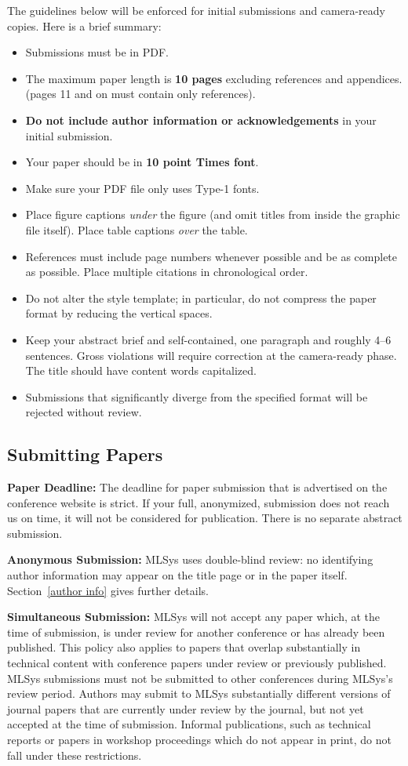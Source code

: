 \documentclass{article}
\begin{document}
The guidelines below will be enforced for initial submissions and
camera-ready copies. Here is a brief summary:
\begin{itemize}
\item Submissions must be in PDF\@.
\item The maximum paper length is \textbf{10 pages} excluding references and appendices.
    (pages 11 and on must contain only references).
\item \textbf{Do not include author information or acknowledgements} in your
    initial submission.
\item Your paper should be in \textbf{10 point Times font}.
\item Make sure your PDF file only uses Type-1 fonts.
\item Place figure captions \emph{under} the figure (and omit titles from inside
    the graphic file itself). Place table captions \emph{over} the table.
\item References must include page numbers whenever possible and be as complete
    as possible. Place multiple citations in chronological order.
\item Do not alter the style template; in particular, do not compress the paper
    format by reducing the vertical spaces.
\item Keep your abstract brief and self-contained, one paragraph and roughly
    4--6 sentences. Gross violations will require correction at the
    camera-ready phase. The title should have content words capitalized.
\item Submissions that significantly diverge from the specified format
    will be rejected without review.
\end{itemize}

\subsection{Submitting Papers}

\textbf{Paper Deadline:} The deadline for paper submission that is
advertised on the conference website is strict. If your full,
anonymized, submission does not reach us on time, it will not be
considered for publication. There is no separate abstract submission.

\textbf{Anonymous Submission:} MLSys uses double-blind review: no identifying
author information may appear on the title page or in the paper
itself. Section~\ref{author info} gives further details.

\textbf{Simultaneous Submission:} MLSys will not accept any paper which,
at the time of submission, is under review for another conference or
has already been published. This policy also applies to papers that
overlap substantially in technical content with conference papers
under review or previously published. MLSys submissions must not be
submitted to other conferences during MLSys's review period. Authors
may submit to MLSys substantially different versions of journal papers
that are currently under review by the journal, but not yet accepted
at the time of submission. Informal publications, such as technical
reports or papers in workshop proceedings which do not appear in
print, do not fall under these restrictions.
\end{document}

